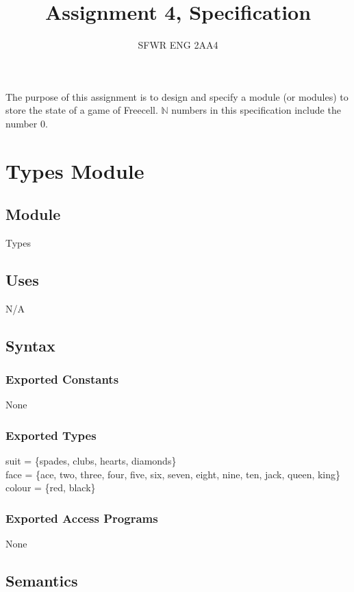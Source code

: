 \documentclass[12pt]{article}
\title{Assignment 4, Specification}
\author{SFWR ENG 2AA4}
\begin{document}
\maketitle

The purpose of this assignment is to design and specify a module (or modules) to store 
the state of a game of Freecell. $\mathbb{N}$ numbers in this specification include the 
number 0.

\newpage

\section* {Types Module}

\subsection*{Module}

Types

\subsection* {Uses}

N/A

\subsection* {Syntax}

\subsubsection* {Exported Constants}

None

\subsubsection* {Exported Types}

suit = \{spades, clubs, hearts, diamonds\}\\ 
face = \{ace, two, three, four, five, six, seven, eight, nine, ten, jack, queen, king\}\\
colour = \{red, black\}

\subsubsection* {Exported Access Programs}

None

\subsection* {Semantics}
\end{document}
